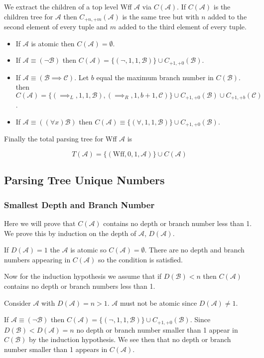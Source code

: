 \documentclass[12pt]{article}
\theoremstyle{break}
\theoremstyle{break}
\theoremstyle{break}
\theoremstyle{break}
\theoremstyle{break}
\newtheorem{informal definition}[definition]{Informal Definition}
\newcommand{\mc}[1]{\mathcal{#1}}
\begin{document}
We extract the children of a top level Wff $\mc{A}$ via $C(\mc{A})$.
If $C(\mc{A})$ is the children tree for $\mc{A}$ then $C_{+n, +m}(\mc{A})$ is the same tree but with $n$ added to the second element of every tuple and $m$ added to the third element of every tuple.


\hrulefill
\begin{itemize}
\item{If $\mc{A}$ is atomic then $C(\mc{A}) = \emptyset$.}
\item{If $\mc{A} \equiv (\lnot \mc{B})$ then $C(\mc{A}) = \{(\lnot, 1, 1, \mc{B})\} \cup C_{+1, +0}(\mc{B})$.}
\item{If $\mc{A} \equiv (\mc{B} \implies \mc{C})$. Let $b$ equal the maximum branch number in $C(\mc{B})$. then $C(\mc{A}) = \{(\implies_L, 1, 1, \mc{B}), (\implies_R, 1, b+1, \mc{C})\} \cup C_{+1, +0}(\mc{B}) \cup C_{+1, +b}(\mc{C})$.}
\item{If $\mc{A} \equiv ((\forall x)\mc{B})$ then $C(\mc{A}) \equiv \{(\forall, 1, 1, \mc{B})\} \cup C_{+1, +0}(\mc{B})$.}
\end{itemize}
\hrulefill

Finally the total parsing tree for Wff $\mc{A}$ is

$$
T(\mc{A}) = \{(\text{Wff}, 0, 1, \mc{A})\} \cup C(\mc{A})
$$

\subsection{Parsing Tree Unique Numbers}

\subsubsection{Smallest Depth and Branch Number}
Here we will prove that $C(\mc{A})$ contains no depth or branch number less than 1. We prove this by induction on the depth of $\mc{A}$, $D(\mc{A})$.

If $D(\mc{A}) = 1$ the $\mc{A}$ is atomic so $C(\mc{A}) = \emptyset$. There are no depth and branch numbers appearing in $C(\mc{A})$ so the condition is satisfied.

Now for the induction hypothesis we assume that if $D(\mc{B}) < n$ then $C(\mc{A})$ contains no depth or branch numbers less than 1.

Consider $\mc{A}$ with $D(\mc{A}) = n > 1$. $\mc{A}$ must not be atomic since $D(\mc{A}) \neq 1$.

If $\mc{A} \equiv (\lnot \mc{B})$ then $C(\mc{A}) = \{(\lnot, 1, 1, \mc{B})\} \cup C_{+1, +0}(\mc{B})$. Since $D(\mc{B}) < D(\mc{A}) = n$ no depth or branch number smaller than 1 appear in $C(\mc{B})$ by the induction hypothesis. We see then that no depth or branch number smaller than 1 appears in $C(\mc{A})$.
\end{document}
